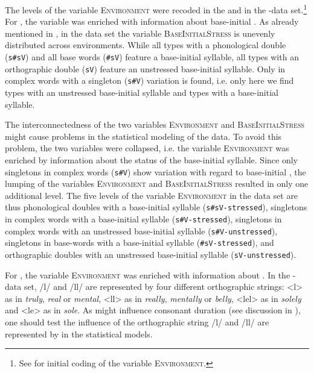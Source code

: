 The levels of the variable \textsc{Environment} were recoded in the  and in the -data set.\footnote{See  for initial coding of the variable \textsc{Environment.}} 
 For , the variable was enriched with information about base-initial . 
 As already mentioned in , in the data set the variable \textsc{BaseInitialStress} is unevenly distributed across environments.  While all types with a phonological double (\texttt{s\#sV}) and all base words (\texttt{\#sV}) feature a  base-initial syllable, all types with an orthographic double (\texttt{sV}) feature an unstressed base-initial syllable. Only in complex words with a singleton (\texttt{s\#V}) variation is found, i.e. only here we find types with an unstressed base-initial syllable and types with a  base-initial syllable. 
 
 The interconnectedness of the two variables \textsc{Environment} and \textsc{BaseInitialStress} might cause problems in  the statistical modeling of the data. To avoid this problem, the two variables were collapsed, i.e. the variable \textsc{Environment} was enriched by information about the  status of the base-initial syllable. Since only singletons in complex words (\texttt{s\#V}) show variation with regard to base-initial , the lumping of the variables \textsc{Environment} and \textsc{BaseInitialStress} resulted in only one additional level. 
 The five levels of the variable \textsc{Environment} in the data set are thus phonological doubles with a  base-initial syllable (\texttt{s\#sV-stressed}), singletons in complex words with a  base-initial syllable (\texttt{s\#V-stressed}), singletons in complex words with an unstressed base-initial syllable (\texttt{s\#V-unstressed}), singletons in base-words with a  base-initial syllable (\texttt{\#sV-stressed}), and orthographic doubles with an unstressed base-initial syllable (\texttt{sV-unstressed}).

 For , the variable \textsc{Environment} was enriched with information about . 
In the -data set, /l/ and /ll/ are represented by four different orthographic strings:  <l> as in \textit{truly},  \textit{real} or \textit{mental}, <ll> as in \textit{really}, \textit{mentally} or \textit{belly}, <lel> as in \textit{solely} and <le> as in \textit{sole}. As  might influence consonant duration (see discussion in ), one should test the influence of the orthographic string /l/ and /ll/ are represented by in the statistical models.







